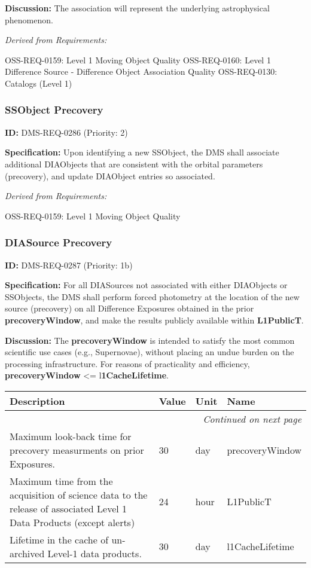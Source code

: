 \documentclass[SE,toc,lsstdraft]{lsstdoc}
\makeatletter
\newcommand{\paramname}[1]{\hspace{0pt}#1}
\newcommand{\unitname}[1]{\hspace{0pt}#1}
\newenvironment{parameters}[0]{%
\setlength\LTleft{0pt}
\setlength\LTright{\fill}
\begin{small}
\begin{longtable}[]{|p{0.49\textwidth}|l|p{0.6in}|p{1.70in}@{}|}

\hline \textbf{Description} & \textbf{Value} & \textbf{Unit} & \textbf{Name} \\ \hline
\endhead

\hline \multicolumn{4}{r}{\emph{Continued on next page}} \\
\endfoot

\hline\hline
\endlastfoot
}{%
\hline
\end{longtable}
\end{small}
}
\makeatother
\begin{document}
\textbf{Discussion: }The association will represent the underlying astrophysical phenomenon.

\emph{Derived from Requirements:}

OSS-REQ-0159:
Level 1 Moving Object Quality \newline
OSS-REQ-0160:
Level 1 Difference Source - Difference Object Association Quality \newline
OSS-REQ-0130:
Catalogs (Level 1) \newline

\subsubsection{SSObject Precovery}

\label{DMS-REQ-0286}
\textbf{ID:} DMS-REQ-0286 (Priority: 2)

\textbf{Specification:} Upon identifying a new SSObject, the DMS shall associate additional DIAObjects that are consistent with the orbital parameters (precovery), and update DIAObject entries so associated.

\emph{Derived from Requirements:}

OSS-REQ-0159:
Level 1 Moving Object Quality \newline

\subsubsection{DIASource Precovery}

\label{DMS-REQ-0287}
\textbf{ID:} DMS-REQ-0287 (Priority: 1b)

\textbf{Specification:} For all DIASources not associated with either DIAObjects or SSObjects, the DMS shall perform forced photometry at the location of the new source (precovery) on all Difference Exposures obtained in the prior \textbf{precoveryWindow}, and make the results publicly available within \textbf{L1PublicT}.

\textbf{Discussion: }The \textbf{precoveryWindow }is intended to satisfy the most common scientific use cases (e.g., Supernovae), without placing an undue burden on the processing infrastructure.  For reasons of practicality and efficiency, \textbf{precoveryWindow }<= l\textbf{1CacheLifetime}.

\begin{parameters}
Maximum look-back time for precovery measurments on prior Exposures.
&
30
&
\unitname{%
day
}
&
\paramname{%
precoveryWindow
} \\\hline
    Maximum time from the acquisition of science data to the release of associated Level 1 Data Products (except alerts)
&
24
&
\unitname{%
hour
}
&
\paramname{%
L1PublicT
} \\\hline
Lifetime in the cache of un-archived Level-1 data products.
&
30
&
\unitname{%
day
}
&
\paramname{%
l1CacheLifetime
} \\\hline
\end{parameters}
\end{document}
